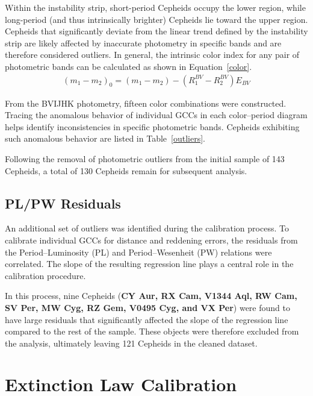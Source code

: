 Within the instability strip, short-period Cepheids occupy the lower region, while long-period (and thus intrinsically brighter) Cepheids lie toward the upper region. Cepheids that significantly deviate from the linear trend defined by the instability strip are likely affected by inaccurate photometry in specific bands and are therefore considered outliers. In general, the intrinsic color index for any pair of photometric bands can be calculated as shown in Equation~\ref{color}.
\begin{align}
	(m_1-m_2)_0 = (m_1-m_2) - (R_1^{BV} - R_2^{BV}) E_{BV}
	\label{color}
\end{align}

From the BVIJHK photometry, fifteen color combinations were constructed. Tracing the anomalous behavior of individual GCCs in each color–period diagram helps identify inconsistencies in specific photometric bands. Cepheids exhibiting such anomalous behavior are listed in Table~\ref{outliers}.

 

\vspace{-0.2cm}

 

Following the removal of photometric outliers from the initial sample of 143 Cepheids, a total of 130 Cepheids remain for subsequent analysis.

\subsection{PL/PW Residuals}
An additional set of outliers was identified during the calibration process. To calibrate individual GCCs for distance and reddening errors, the residuals from the Period–Luminosity (PL) and Period–Wesenheit (PW) relations were correlated. The slope of the resulting regression line plays a central role in the calibration procedure.

In this process, nine Cepheids (\textbf{CY Aur, RX Cam, V1344 Aql, RW Cam, SV Per, MW Cyg, RZ Gem, V0495 Cyg, and VX Per}) were found to have large residuals that significantly affected the slope of the regression line compared to the rest of the sample. These objects were therefore excluded from the analysis, ultimately leaving 121 Cepheids in the cleaned dataset.

\section{Extinction Law Calibration}

